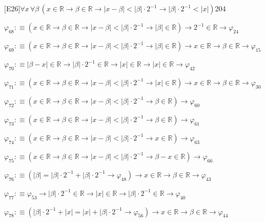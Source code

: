 \begin{fullproof}{[E26]}{$\forall x\,\forall \beta\,(x \in \mathbb{R} \to \beta \in \mathbb{R} \to \lvert x - \beta \rvert < \lvert \beta \rvert \cdot 2^{-1} \to \lvert \beta \rvert \cdot 2^{-1} < \lvert x \rvert)$}{204}
\begin{abbrevlist}
\item $\varphi_{68} :\equiv (x \in \mathbb{R} \to \beta \in \mathbb{R} \to \lvert x - \beta \rvert < \lvert \beta \rvert \cdot 2^{-1} \to \lvert \beta \rvert \in \mathbb{R}) \to 2^{-1} \in \mathbb{R} \to \varphi_{24}$
\item $\varphi_{69} :\equiv (x \in \mathbb{R} \to \beta \in \mathbb{R} \to \lvert x - \beta \rvert < \lvert \beta \rvert \cdot 2^{-1} \to \lvert \beta \rvert \in \mathbb{R}) \to x \in \mathbb{R} \to \beta \in \mathbb{R} \to \varphi_{15}$
\item $\varphi_{70} :\equiv \lvert \beta - x \rvert \in \mathbb{R} \to \lvert \beta \rvert \cdot 2^{-1} \in \mathbb{R} \to \lvert x \rvert \in \mathbb{R} \to \lvert x \rvert \in \mathbb{R} \to \varphi_{42}$
\item $\varphi_{71} :\equiv (x \in \mathbb{R} \to \beta \in \mathbb{R} \to \lvert x - \beta \rvert < \lvert \beta \rvert \cdot 2^{-1} \to \lvert x \rvert \in \mathbb{R}) \to x \in \mathbb{R} \to \beta \in \mathbb{R} \to \varphi_{30}$
\item $\varphi_{72} :\equiv (x \in \mathbb{R} \to \beta \in \mathbb{R} \to \lvert x - \beta \rvert < \lvert \beta \rvert \cdot 2^{-1} \to \beta \in \mathbb{R}) \to \varphi_{60}$
\item $\varphi_{73} :\equiv (x \in \mathbb{R} \to \beta \in \mathbb{R} \to \lvert x - \beta \rvert < \lvert \beta \rvert \cdot 2^{-1} \to \beta \in \mathbb{R}) \to \varphi_{61}$
\item $\varphi_{74} :\equiv (x \in \mathbb{R} \to \beta \in \mathbb{R} \to \lvert x - \beta \rvert < \lvert \beta \rvert \cdot 2^{-1} \to x \in \mathbb{R}) \to \varphi_{63}$
\item $\varphi_{75} :\equiv (x \in \mathbb{R} \to \beta \in \mathbb{R} \to \lvert x - \beta \rvert < \lvert \beta \rvert \cdot 2^{-1} \to \beta - x \in \mathbb{R}) \to \varphi_{66}$
\item $\varphi_{76} :\equiv (\lvert \beta \rvert = \lvert \beta \rvert \cdot 2^{-1} + \lvert \beta \rvert \cdot 2^{-1} \to \varphi_{48}) \to x \in \mathbb{R} \to \beta \in \mathbb{R} \to \varphi_{43}$
\item $\varphi_{77} :\equiv \varphi_{53} \to \lvert \beta \rvert \cdot 2^{-1} \in \mathbb{R} \to \lvert x \rvert \in \mathbb{R} \to \lvert \beta \rvert \cdot 2^{-1} \in \mathbb{R} \to \varphi_{40}$
\item $\varphi_{78} :\equiv (\lvert \beta \rvert \cdot 2^{-1} + \lvert x \rvert = \lvert x \rvert + \lvert \beta \rvert \cdot 2^{-1} \to \varphi_{56}) \to x \in \mathbb{R} \to \beta \in \mathbb{R} \to \varphi_{44}$

\end{abbrevlist}
\end{fullproof}
